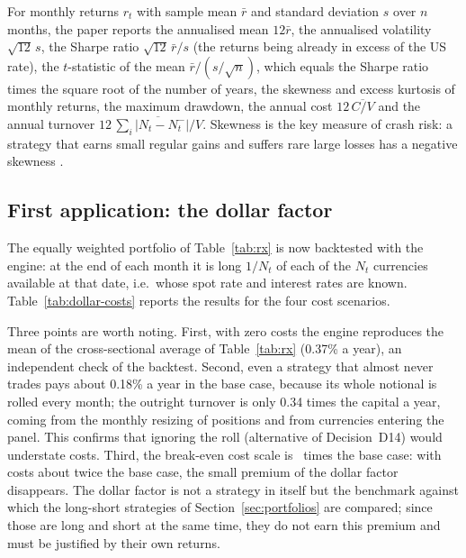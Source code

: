 For monthly returns $r_t$ with sample mean $\bar r$ and standard deviation $s$ over $n$ months, the paper reports the annualised mean $12\bar r$, the annualised volatility $\sqrt{12}\,s$, the Sharpe ratio $\sqrt{12}\,\bar r/s$ (the returns being already in excess of the US rate), the $t$-statistic of the mean $\bar r/(s/\sqrt n)$, which equals the Sharpe ratio times the square root of the number of years, the skewness and excess kurtosis of monthly returns, the maximum drawdown, the annual cost $12\,\overline{C/V}$ and the annual turnover $12\,\overline{\sum_i|N_t - N^-_{t}|/V}$.
Skewness is the key measure of crash risk: a strategy that earns small regular gains and suffers rare large losses has a negative skewness \citep{brunnermeier2008}.

\subsection{First application: the dollar factor}\label{sec:dollar}

The equally weighted portfolio of Table~\ref{tab:rx} is now backtested with the engine: at the end of each month it is long $1/N_t$ of each of the $N_t$ currencies available at that date, i.e.\ whose spot rate and interest rates are known.
Table~\ref{tab:dollar-costs} reports the results for the four cost scenarios.

\begin{table}[h]
\centering
\footnotesize

\caption{Equally weighted currency portfolio (dollar factor), February 1999 -- September 2026, monthly excess returns net of transaction costs. Costs are the base case of Section~\ref{sec:costs} multiplied by 0, 1, 2 and 5. Generated by \texttt{scripts/backtest\_benchmarks.py}.}
\label{tab:dollar-costs}
\end{table}

Three points are worth noting.
First, with zero costs the engine reproduces the mean of the cross-sectional average of Table~\ref{tab:rx} (0.37\% a year), an independent check of the backtest.
Second, even a strategy that almost never trades pays about 0.18\% a year in the base case, because its whole notional is rolled every month; the outright turnover is only 0.34 times the capital a year, coming from the monthly resizing of positions and from currencies entering the panel.
This confirms that ignoring the roll (alternative of Decision~D14) would understate costs.
Third, the break-even cost scale is \unskip~times the base case: with costs about twice the base case, the small premium of the dollar factor disappears.
The dollar factor is not a strategy in itself but the benchmark against which the long-short strategies of Section~\ref{sec:portfolios} are compared; since those are long and short at the same time, they do not earn this premium and must be justified by their own returns.

